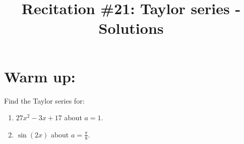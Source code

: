 \documentclass[noinstructornotes]{ximera}
\title{Recitation \#21: Taylor series - Solutions}
\begin{document}
\begin{abstract}		\end{abstract}
\maketitle



\section{Warm up:}
Find the Taylor series for:  
	\begin{enumerate}
	\item  $27x^2 - 3x + 17$ about $a=1$.  
	\item  $\sin(2x)$ about $a = \frac{\pi}{8}$.  
	\end{enumerate}
	
\end{document}
